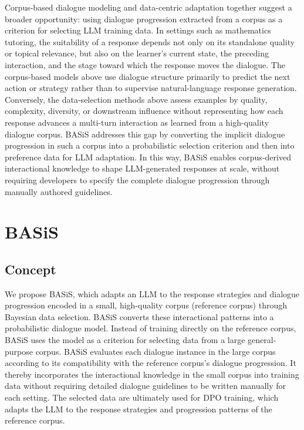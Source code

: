 \documentclass[manuscript,review,anonymous]{acmart}
\begin{document}
Corpus-based dialogue modeling and data-centric adaptation together suggest a broader opportunity: using dialogue progression extracted from a corpus as a criterion for selecting LLM training data. In settings such as mathematics tutoring, the suitability of a response depends not only on its standalone quality or topical relevance, but also on the learner's current state, the preceding interaction, and the stage toward which the response moves the dialogue. The corpus-based models above use dialogue structure primarily to predict the next action or strategy rather than to supervise natural-language response generation. Conversely, the data-selection methods above assess examples by quality, complexity, diversity, or downstream influence without representing how each response advances a multi-turn interaction as learned from a high-quality dialogue corpus. BASiS addresses this gap by converting the implicit dialogue progression in such a corpus into a probabilistic selection criterion and then into preference data for LLM adaptation. In this way, BASiS enables corpus-derived interactional knowledge to shape LLM-generated responses at scale, without requiring developers to specify the complete dialogue progression through manually authored guidelines.


\section{BASiS}
\label{sec:method}

\subsection{Concept}
\label{sec:method_concept}

We propose BASiS, which adapts an LLM to the response strategies and dialogue progression encoded in a small, high-quality corpus (reference corpus) through Bayesian data selection. BASiS converts these interactional patterns into a probabilistic dialogue model. Instead of training directly on the reference corpus, BASiS uses the model as a criterion for selecting data from a large general-purpose corpus.
BASiS evaluates each dialogue instance in the large corpus according to its compatibility with the reference corpus's dialogue progression. It thereby incorporates the interactional knowledge in the small corpus into training data without requiring detailed dialogue guidelines to be written manually for each setting.
The selected data are ultimately used for DPO training, which adapts the LLM to the response strategies and progression patterns of the reference corpus.
\end{document}
